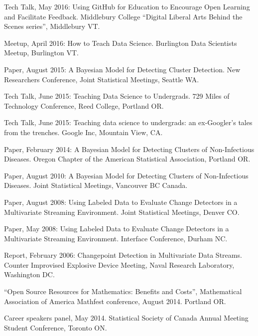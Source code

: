 \documentclass[10pt]{article}
\renewcommand{\section}[1]{\pagebreak[3]%
    \vspace{1.3\baselineskip}%
    \phantomsection\addcontentsline{toc}{section}{#1}%
    \noindent\llap{\scshape\smash{\parbox[t]{\marginparwidth}{\hyphenpenalty=10000\raggedright #1}}}%
    \vspace{-\baselineskip}\par}
\begin{document}
\begin{innerlist}
	\item Tech Talk, May 2016: Using GitHub for Education to Encourage Open Learning and Facilitate Feedback. Middlebury College ``Digital Liberal Arts Behind the Scenes series'', Middlebury VT.
	\item Meetup, April 2016: How to Teach Data Science. Burlington Data Scientists Meetup, Burlington VT.
    \item Paper, August 2015: A Bayesian Model for Detecting Cluster Detection. New Researchers Conference, Joint Statistical Meetings, Seattle WA.
    \item Tech Talk, June 2015: Teaching Data Science to Undergrads. 729 Miles of Technology Conference, Reed College, Portland OR. 
    \item Tech Talk, June 2015: Teaching data science to undergrads: an ex-Googler's tales from the trenches. Google Inc, Mountain View, CA.
    \item Paper, February 2014: A Bayesian Model for Detecting Clusters of Non-Infectious Diseases. Oregon Chapter of the American Statistical Association, Portland OR.
    \item Paper, August 2010: A Bayesian Model for Detecting Clusters of Non-Infectious Diseases. Joint Statistical Meetings, Vancouver BC Canada.
    \item Paper, August 2008: Using Labeled Data to Evaluate Change Detectors in a Multivariate Streaming Environment. Joint Statistical Meetings, Denver CO.
    \item Paper, May 2008: Using Labeled Data to Evaluate Change Detectors in a Multivariate Streaming Environment. Interface Conference, Durham NC.
    \item Report, February 2006: Changepoint Detection in Multivariate Data Streams. Counter Improvised Explosive Device Meeting, Naval Research Laboratory, Washington DC.
\end{innerlist}







\vspace{0.1in}
\section{Panels}

\begin{innerlist}
	\item ``Open Source Resources for Mathematics: Benefits and Costs'', Mathematical Association of America Mathfest conference, August 2014. Portland OR.
	\item Career speakers panel, May 2014. Statistical Society of Canada Annual Meeting Student Conference, Toronto ON.
\end{innerlist}
\end{document}

